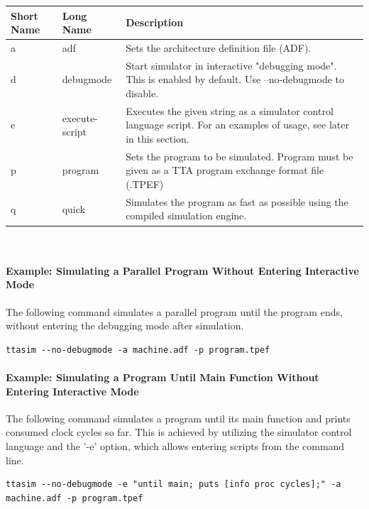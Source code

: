 \documentclass[twoside]{tceusermanual}
\begin{document}
\begin{tabular}{p{}p{}
                p{}}
\textbf{Short Name} &\textbf{Long Name} &\textbf{Description} \\
\hline
a & adf & Sets the architecture definition file (ADF). \\
d & debugmode & Start simulator in interactive "debugging mode". This is enabled by default. Use --no-debugmode to disable.\\
e & execute-script & Executes the given string as a simulator control language script. For an examples of usage, see later in this section. \\
p & program & Sets the program to be simulated. Program must be given as a TTA program exchange format file (.TPEF) \\
q & quick & Simulates the program as fast as possible using the compiled simulation engine. \\
\end{tabular}\\



\paragraph{Example: Simulating a Parallel Program Without Entering Interactive
Mode}

The following command simulates a parallel program until the program ends,
without entering the debugging mode after simulation.

\begin{verbatim}
ttasim --no-debugmode -a machine.adf -p program.tpef
\end{verbatim}

\paragraph{Example: Simulating a Program Until Main Function Without
Entering Interactive Mode}

The following command simulates a program until its main function and
prints consumed clock cycles so far. This is achieved by utilizing the simulator
control language and the '-e' option, which allows entering scripts 
from the command line.

\begin{verbatim}
ttasim --no-debugmode -e "until main; puts [info proc cycles];" -a machine.adf -p program.tpef
\end{verbatim}
\end{document}
